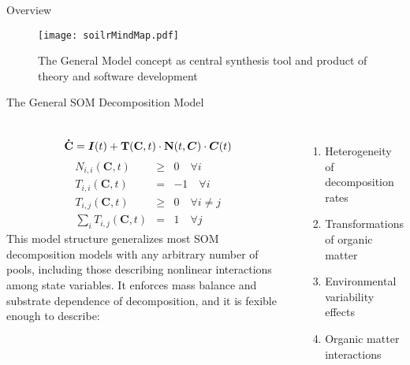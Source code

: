 \documentclass[final,hyperref={pdfpagelabels=false}, professionalmath, mathserif, 11pt]{beamer}
\begin{document}
\graphicspath{ {./images/} }
\begin{frame}
%
\begin{columns}
  
  \begin{column}{.48\textwidth}
    \begin{minipage}[T]{.95\textwidth}
      \begin{block}{Overview}
	\begin{figure}
	  \texttt{[image: soilrMindMap.pdf]}
	  \caption{The General Model concept as central synthesis tool and product of theory and software development}
	\end{figure}
      \end{block}
    \begin{block}{The General SOM Decomposition Model}
    \begin{columns}[b]
    		\[
		\mathbf{\dot{C}}= \bm{I}(t) + {\bf T}(\mathbf{C},t) \cdot {\bf N}(t, \bm{C}) \cdot \bm{C}(t)
    		\]
    		\begin{equation*}	
    		\label{structCond}
    		\begin{array}{lcl}	
    		N_{i,i}(\mathbf{C},t) 		&\ge& 	 0 \quad \forall i \\
    		T_{i,i}(\mathbf{C},t) 		&=& 	 -1 \quad \forall i \\
    		T_{i,j}(\mathbf{C},t) 		&\ge& 	 0 \quad \forall i \ne j \\
    		\sum_i T_{i,j}(\mathbf{C},t) 	&=  &	 1\quad \forall j 
    		\end{array}	
    		\end{equation*}	
    		This model structure generalizes most SOM decomposition models with any arbitrary number of pools, including those describing nonlinear interactions among state variables. It enforces mass balance and substrate dependence of decomposition, and it is fexible enough to describe:
		\begin{enumerate}
		\item Heterogeneity of decomposition rates
		\item Transformations of organic matter
		\item Environmental variability effects
		\item Organic matter interactions
		\end{enumerate}


\end{columns}
\end{block}
\end{minipage}
\end{column}
\end{columns}
\end{frame}
\end{document}
